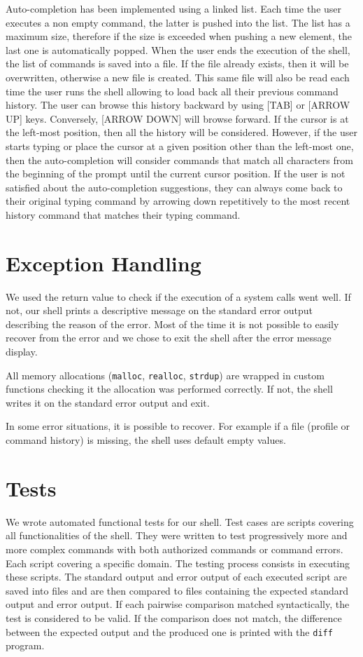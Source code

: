 \documentclass[fleqn]{article}
\begin{document}
Auto-completion has been implemented using a linked list. Each time the user executes a non empty command, the latter is pushed into the list.
The list has a maximum size, therefore if the size is exceeded when pushing a new element, the last one is automatically popped.
When the user ends the execution of the shell, the list of commands is saved into a file. If the file already exists, then it will be overwritten, otherwise a new file is created.
This same file will also be read each time the user runs the shell allowing to load back all their previous command history.
The user can browse this history backward by using [TAB] or [ARROW UP] keys. Conversely, [ARROW DOWN] will browse forward.
If the cursor is at the left-most position, then all the history will be considered.
However, if the user starts typing or place the cursor at a given position other than the left-most one, then the auto-completion will consider commands that match all characters from the beginning of the prompt until the current cursor position.
If the user is not satisfied about the auto-completion suggestions, they can always come back to their original typing command by arrowing down repetitively to the most recent history command that matches their typing command.

\section{Exception Handling}

We used the return value to check if the execution of a system calls went well. If not, our shell prints a descriptive message on the standard error output describing the reason of the error. Most of the time it is not possible to easily recover from the error and we chose to exit the shell after the error message display.

All memory allocations (\texttt{malloc}, \texttt{realloc}, \texttt{strdup}) are wrapped in custom functions checking it the allocation was performed correctly. If not, the shell writes it on the standard error output and exit.

In some error situations, it is possible to recover. For example if a file (profile or command history) is missing, the shell uses default empty values. 

\section{Tests}

We wrote automated functional tests for our shell.
Test cases are scripts covering all functionalities of the shell. They were written to test progressively more and more complex commands with both authorized commands or command errors. Each script covering a specific domain.
The testing process consists in executing these scripts.
The standard output and error output of each executed script are saved into files and are then compared to files containing the expected standard output and error output.
If each pairwise comparison matched syntactically, the test is considered to be valid.
If the comparison does not match, the difference between the expected output and the produced one is printed with the \texttt{diff} program.
\end{document}
